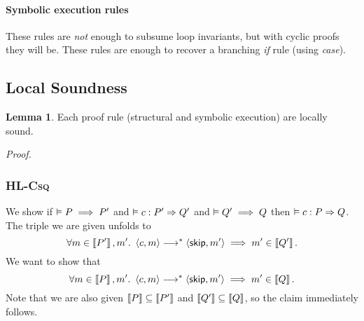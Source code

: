 \documentclass[10pt]{article}
\theoremstyle{definition}
\newtheorem{lemma}{Lemma}
\begin{document}
\paragraph{Symbolic execution rules}





\noindent
These rules are \emph{not} enough to subsume loop invariants, but with cyclic proofs they will be.
These rules are enough to recover a branching \emph{if} rule (using \emph{case}).



\subsection*{Local Soundness}


\begin{lemma}
    Each proof rule (structural and symbolic execution) are locally sound.
\end{lemma}

\noindent
\emph{Proof.}

\subsubsection*{\textsc{HL-Csq}}
We show if $\vDash P \implies P'$ and 
      $\VAL \Triple c : P' => Q'$ and 
      $\vDash Q' \implies Q$
then $\VAL \Triple c : P => Q$.
The triple we are given unfolds to
\[
    \forall m \in \Interp{P'}, m'.\
    \Cfg(c, m) \sstepstotrans \Cfg(\Skip, m')
    \implies m' \in \Interp{Q'}.
\]
We want to show that
\[
    \forall m \in \Interp P, m'.\
    \Cfg(c, m) \sstepstotrans \Cfg(\Skip, m')
    \implies m' \in \Interp Q.
\]
Note that we are also given $\left\llbracket P \right\rrbracket \subseteq \left\llbracket P' \right\rrbracket$ and $\left\llbracket Q' \right\rrbracket \subseteq \left\llbracket Q \right\rrbracket$,
so the claim immediately follows.
\end{document}
